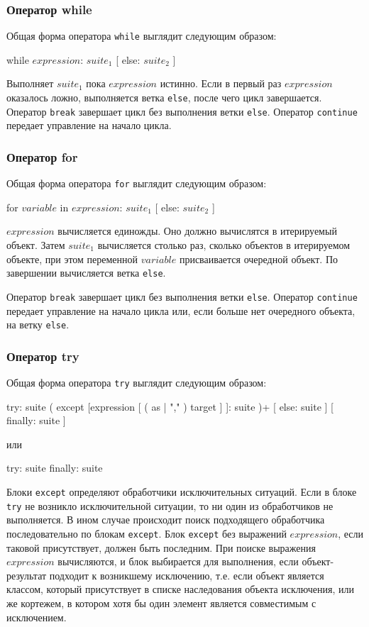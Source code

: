 \subsubsection{Оператор while}
Общая форма оператора \lstinline{while} выглядит следующим образом:
\begin{pylst}{}{}
while $expression$: $suite_1$
[ else: $suite_2$ ]
\end{pylst}

Выполняет $suite_1$ пока $expression$ истинно. Если в первый раз $expression$ оказалось ложно, выполняется ветка \lstinline{else}, после чего цикл завершается. Оператор \lstinline{break} завершает цикл без выполнения ветки \lstinline{else}. Оператор \lstinline{continue} передает управление на начало цикла.

\subsubsection{Оператор for}
Общая форма оператора \lstinline{for} выглядит следующим образом:
\begin{pylst}{}{}
for $variable$ in $expression$: $suite_1$
[ else: $suite_2$ ]
\end{pylst}

$expression$ вычисляется единожды. Оно должно вычислятся в итерируемый объект. Затем $suite_1$ вычисляется столько раз, сколько объектов в итерируемом объекте, при этом переменной $variable$ присваивается очередной объект. По завершении вычисляется ветка \lstinline{else}.

Оператор \lstinline{break} завершает цикл без выполнения ветки \lstinline{else}. Оператор \lstinline{continue} передает управление на начало цикла или, если больше нет очередного объекта, на ветку \lstinline{else}.

\subsubsection{Оператор try}
Общая форма оператора \lstinline{try} выглядит следующим образом:
\begin{pylst}{}{}
try: suite
( except [expression [ ( as | "," ) target ] ]: suite )+
[ else: suite ]
[ finally: suite ]
\end{pylst}
или
\begin{pylst}{}{}
try: suite
finally: suite
\end{pylst}

Блоки \lstinline{except} определяют обработчики исключительных ситуаций. Если в блоке \lstinline{try} не возникло исключительной ситуации, то ни один из обработчиков не выполняется. В ином случае происходит поиск подходящего обработчика последовательно по блокам \lstinline{except}. Блок \lstinline{except} без выражений $expression$, если таковой присутствует, должен быть последним. При поиске выражения $expression$ вычисляются, и блок выбирается для выполнения, если объект-результат подходит к возникшему исключению, т.е. если объект является классом, который присутствует в списке наследования объекта исключения, или же кортежем, в котором хотя бы один элемент является совместимым с исключением.

